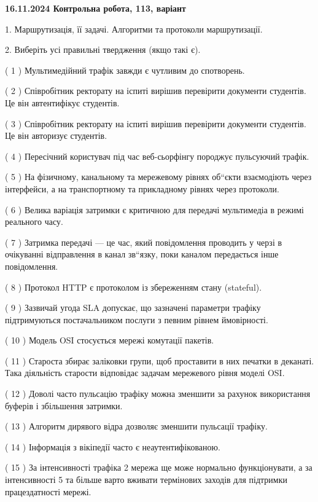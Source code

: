 \documentclass[12pt, ukrainian]{article}
\begin{document}
\vspace{4mm}
\newpage
\begin {large}

\textbf{16.11.2024 Контрольна робота, 113, варіант  }\par


{
1. Маршрутизація, її задачі. Алгоритми та протоколи маршрутизації.



\vspace{2mm}
2. Виберіть усі правильні твердження (якщо такі є).\par
\vspace{2mm}

( 1 ) Мультимедійний трафік завжди є чутливим до спотворень.

( 2 ) Співробітник ректорату на іспиті вирішив перевірити документи студентів. Це він автентифікує студентів.

( 3 ) Співробітник ректорату на іспиті вирішив перевірити документи студентів. Це він авторизує студентів.

( 4 ) Пересічний користувач під час веб-сьорфінгу породжує пульсуючий трафік.

( 5 ) На фізичному, канальному та мережевому рівнях об“єкти взаємодіють через інтерфейси, а на транспортному та прикладному рівнях через протоколи.

( 6 ) Велика варіація затримки є критичною для передачі мультимедіа в режимі реального часу.

( 7 ) Затримка передачі — це час, який повідомлення проводить у черзі в очікуванні відправлення в канал зв“язку, поки каналом передається інше повідомлення.

( 8 ) Протокол  HTTP є протоколом із збереженням стану (stateful).

( 9 ) Зазвичай угода  SLA допускає, що зазначені параметри трафіку підтримуються постачальником послуги з певним рівнем ймовірності.

( 10 ) Модель OSI стосується мережі комутації пакетів.

( 11 ) Староста збирає заліковки групи, щоб проставити в них печатки в деканаті. Така діяльність старости відповідає задачам мережевого рівня моделі OSI.

( 12 ) Доволі часто пульсацію трафіку можна зменшити за рахунок використання буферів і збільшення затримки.

( 13 ) Алгоритм дирявого відра дозволяє зменшити пульсації трафіку.

( 14 ) Інформація з вікіпедії часто є неаутентифікованою.

( 15 ) За інтенсивності трафіка 2 мережа ще може нормально функціонувати, а за інтенсивності 5 та більше варто вживати термінових заходів для підтримки працездатності мережі.
}
\end {large}
\end{document}
